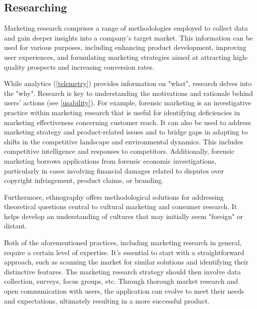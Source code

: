 
\subsection{Researching}

Marketing research comprises a range of methodologies \cite{Este21} employed to collect data and gain deeper insights 
into a company's target market. This information can be used for various purposes, including enhancing product 
development, improving user experiences, and formulating marketing strategies aimed at attracting high-quality prospects 
and increasing conversion rates.

While analytics (\ref{telemetry}) provides information on "what", research delves into the "why". Research is key to 
understanding the motivations and rationale behind users' actions (see \ref{usability}). For example, forensic marketing 
is an investigative practice within marketing research that is useful for identifying deficiencies in marketing 
effectiveness concerning customer reach. It can also be used to address marketing strategy and product-related issues 
and to bridge gaps in adapting to shifts in the competitive landscape and environmental dynamics. This includes 
competitive intelligence and responses to competitors. Additionally, forensic marketing borrows applications from 
forensic economic investigations, particularly in cases involving financial damages related to disputes over copyright 
infringement, product claims, or branding.

Furthermore, ethnography \cite{Mois06} offers methodological solutions for addressing theoretical questions central to 
cultural marketing and consumer research. It helps develop an understanding of cultures that may initially seem 
"foreign" or distant.

Both of the aforementioned practices, including marketing research in general, require a certain level of expertise. 
It's essential to start with a straightforward approach, such as scanning the market for similar solutions  
and identifying their distinctive features. The marketing research strategy should then involve data collection, 
surveys, focus groups, etc. Through thorough market research and open communication with users, the application can 
evolve to meet their needs and expectations, ultimately resulting in a more successful product.
